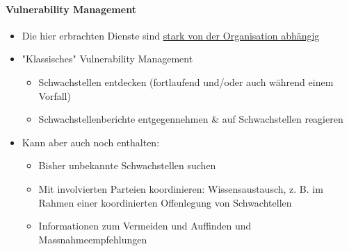 \paragraph{Vulnerability Management}
\begin{itemize}
    \item Die hier erbrachten Dienste sind \underline{stark von der Organisation abhängig}
    \item "Klassisches" Vulnerability Management
    \begin{itemize}
        \item Schwachstellen entdecken (fortlaufend und/oder auch während einem Vorfall)
        \item Schwachstellenberichte entgegennehmen \& auf Schwachstellen reagieren
    \end{itemize}
    \item Kann aber auch noch enthalten:
    \begin{itemize}
        \item Bisher unbekannte Schwachstellen suchen
        \item Mit involvierten Parteien koordinieren: Wissensaustausch, z. B. im Rahmen einer koordinierten Offenlegung von Schwachtellen
        \item Informationen zum Vermeiden und Auffinden und Massnahmeempfehlungen
    \end{itemize}
\end{itemize}

